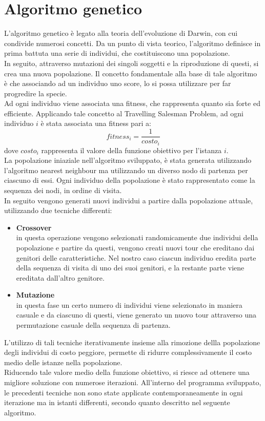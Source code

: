 \section{Algoritmo genetico}
L'algoritmo genetico è legato alla teoria dell'evoluzione di Darwin, con cui condivide numerosi concetti. Da un punto di vista teorico, l'algoritmo definisce in prima battuta una serie di individui, che costituiscono una popolazione.\\
In seguito, attraverso mutazioni dei singoli soggetti e la riproduzione di questi, si crea una nuova popolazione. Il concetto fondamentale alla base di tale algoritmo è che associando ad un individuo uno score, lo si possa utilizzare per far progredire la specie.\\
Ad ogni individuo viene associata una fitness, che rappresenta quanto sia forte ed efficiente. Applicando tale concetto al Travelling Salesman Problem, ad ogni individuo $i$ è stata associata una fitness pari a:
$$fitness_i=\frac{1}{costo_i}$$
dove $costo_i$ rappresenta il valore della funzione obiettivo per l'istanza $i$.\\
La popolazione iniaziale nell'algoritmo sviluppato, è stata generata utilizzando l'algoritmo nearest neighbour ma utilizzando un diverso nodo di partenza per ciascuno di essi. Ogni individuo della popolazione è stato rappresentato come la sequenza dei nodi, in ordine di visita.\\
In seguito vengono generati nuovi individui a partire dalla popolazione attuale, utilizzando due tecniche differenti:
\begin{itemize}
\item{\textbf{Crossover}\\
in questa operazione vengono selezionati randomicamente due individui della popolazione e partire da questi, vengono creati nuovi tour che ereditano dai genitori delle caratteristiche. Nel nostro caso ciascun individuo eredita parte della sequenza di visita di uno dei suoi genitori, e la restante parte viene ereditata dall'altro genitore.}
\item{\textbf{Mutazione}\\
in questa fase un certo numero di individui viene selezionato in maniera casuale e da ciascuno di questi, viene generato un nuovo tour attraverso una permutazione casuale della sequenza di partenza.}
\end{itemize}
L'utilizzo di tali tecniche iterativamente insieme alla rimozione dellla popolazione degli individui di costo peggiore, permette di ridurre complessivamente il costo medio delle istanze nella popolazione.\\
Riducendo tale valore medio della funzione obiettivo, si riesce ad ottenere una migliore soluzione con numerose iterazioni. All'interno del programma sviluppato, le precedenti tecniche non sono state applicate contemporaneamente in ogni iterazione ma in istanti differenti, secondo quanto descritto nel seguente algoritmo.\\

